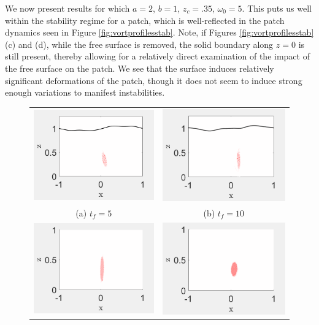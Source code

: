 \documentclass[a4paper,11pt]{article}
\begin{document}
We now present results for which $a=2$, $b=1$, $z_{c}=.35$, $\omega_{0}=5$.  This puts us well within the stability regime for a patch, which is well-reflected in the patch dynamics seen in Figure \ref{fig:vortprofilesstab}.  Note, if Figures \ref{fig:vortprofilesstab} (c) and (d), while the free surface is removed, the solid boundary along $z=0$ is still present, thereby allowing for a relatively direct examination of the impact of the free surface on the patch.  We see that the surface induces relatively significant deformations of the patch, though it does not seem to induce strong enough variations to manifest instabilities.  
\begin{figure}[!h]
\begin{tabular}{cc}
\includegraphics[width=.5\textwidth]{rows_200_cols_400_K_128_mu_pt01_gam_pt031623_F_015895_tf_5_elp_2.png}	& \includegraphics[width=.5\textwidth]{rows_200_cols_400_K_128_mu_pt01_gam_pt031623_F_015895_tf_10_elp_2.png}\\
(a) $t_{f}=5$ & (b) $t_{f}=10$\\
\includegraphics[width=.5\textwidth]{rows_200_cols_400_mu_pt01_gam_pt031623_F_015895_tf_5_elp2.png}	& \includegraphics[width=.5\textwidth]{rows_200_cols_400_mu_pt01_gam_pt031623_F_015895_tf_10_elp2.png}\\

\end{tabular}
\end{figure}
\end{document}
